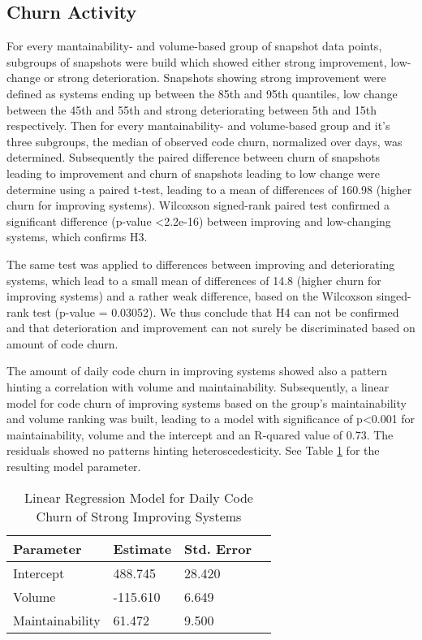 \subsection{Churn Activity}
For every mantainability- and volume-based group of snapshot data points, subgroups of snapshots were build which showed either strong improvement, low-change or strong deterioration. Snapshots showing strong improvement were defined as systems ending up between the 85th and 95th quantiles, low change between the 45th and 55th and strong deteriorating between 5th and 15th respectively.
Then for every mantainability- and volume-based group and it's three subgroups, the median of observed code churn, normalized over days, was determined. Subsequently the paired difference between churn of snapshots leading to improvement and churn of snapshots leading to low change were determine using a paired t-test, leading to a mean of differences of 160.98 (higher churn for improving systems). Wilcoxson signed-rank paired test confirmed a significant difference (p-value \textless 2.2e-16) between improving and low-changing systems, which confirms H3. 

The same test was applied to differences between improving and deteriorating systems, which lead to a small mean of differences of 14.8 (higher churn for improving systems) and a rather weak difference, based on the Wilcoxson singed-rank test (p-value = 0.03052). We thus conclude that H4 can not be confirmed and that deterioration and improvement can not surely be discriminated based on amount of code churn.

The amount of daily code churn in improving systems showed also a pattern hinting a correlation with volume and maintainability. Subsequently, a linear model for code churn of improving systems based on the group's maintainability and volume ranking was built, leading to a model with significance of p\textless0.001 for maintainability, volume and the intercept and an R-quared value of 0.73. The residuals showed no patterns hinting heteroscedesticity. See Table \ref{results_churn} for the resulting model parameter.
\begin{table}[htbp!]
\centering
\caption{Linear Regression Model for Daily Code Churn of Strong Improving Systems}
\begin{tabular}{l  l  l p{1.2cm}}
  \hline			
  Parameter & Estimate & Std. Error\\ \hline
  Intercept & 488.745 & 28.420\\ 
  Volume & -115.610 & 6.649\\ 
  Maintainability & 61.472 & 9.500\\ 
\end{tabular}
\label{results_churn}
\end{table}
